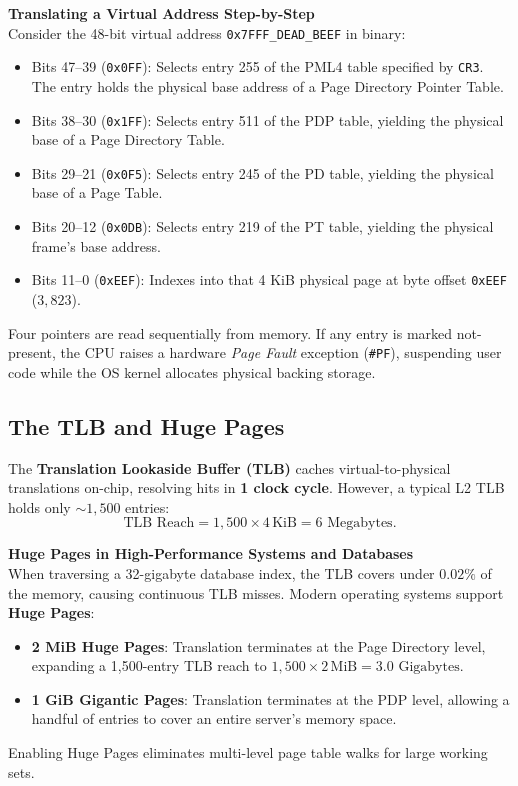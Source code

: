 \begin{walkbox}
\textbf{Translating a Virtual Address Step-by-Step}\\
Consider the 48-bit virtual address \texttt{0x7FFF\_DEAD\_BEEF} in binary:
\begin{itemize}[itemsep=0pt]
    \item Bits 47--39 (\texttt{0x0FF}): Selects entry 255 of the PML4 table specified by \texttt{CR3}. The entry holds the physical base address of a Page Directory Pointer Table.
    \item Bits 38--30 (\texttt{0x1FF}): Selects entry 511 of the PDP table, yielding the physical base of a Page Directory Table.
    \item Bits 29--21 (\texttt{0x0F5}): Selects entry 245 of the PD table, yielding the physical base of a Page Table.
    \item Bits 20--12 (\texttt{0x0DB}): Selects entry 219 of the PT table, yielding the physical frame's base address.
    \item Bits 11--0 (\texttt{0xEEF}): Indexes into that 4 KiB physical page at byte offset \texttt{0xEEF} ($3{,}823$).
\end{itemize}
Four pointers are read sequentially from memory. If any entry is marked not-present, the CPU raises
a hardware \emph{Page Fault} exception (\texttt{\#PF}), suspending user code while the OS
kernel allocates physical backing storage.
\end{walkbox}

\subsection{The TLB and Huge Pages}

The \textbf{Translation Lookaside Buffer (TLB)} caches virtual-to-physical translations
on-chip, resolving hits in \textbf{1 clock cycle}.
However, a typical L2 TLB holds only $\sim 1{,}500$ entries:
\[
    \text{TLB Reach} = 1{,}500 \times 4\,\text{KiB} = 6\text{ Megabytes}.
\]

\begin{applicationbox}
\textbf{Huge Pages in High-Performance Systems and Databases}\\
When traversing a 32-gigabyte database index, the TLB covers under $0.02\%$ of the memory,
causing continuous TLB misses.
Modern operating systems support \textbf{Huge Pages}:
\begin{itemize}[itemsep=0pt]
    \item \textbf{2 MiB Huge Pages}: Translation terminates at the Page Directory level, expanding a 1,500-entry TLB reach to $1{,}500 \times 2\,\text{MiB} = 3.0\text{ Gigabytes}$.
    \item \textbf{1 GiB Gigantic Pages}: Translation terminates at the PDP level, allowing a handful of entries to cover an entire server's memory space.
\end{itemize}
Enabling Huge Pages eliminates multi-level page table walks for large working sets.
\end{applicationbox}

